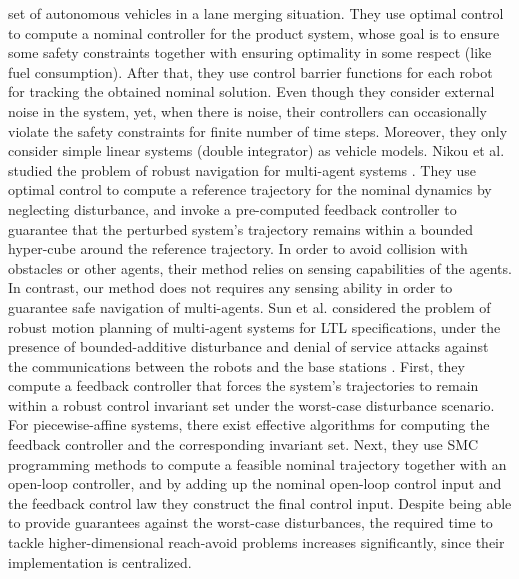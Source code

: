 \begin{enumerate}[(1)]
set of autonomous vehicles in a lane merging situation.
They use optimal control to compute a nominal controller for the product system, 
whose goal is to ensure some safety constraints together with ensuring optimality in some respect (like fuel consumption).
After that, they use control barrier functions for each robot for tracking the obtained nominal solution.
Even though they consider external noise in the system, yet, when there is noise, their controllers can 
occasionally violate the safety constraints for finite number of time steps.
Moreover, they only consider simple linear systems (double integrator) as vehicle models. 
Nikou et al. studied the problem of robust navigation for multi-agent systems \cite{Nikou2019}. 
They use optimal control to compute a reference trajectory for the nominal dynamics by neglecting disturbance, and invoke a  pre-computed feedback controller to guarantee that the perturbed system's trajectory remains within a bounded hyper-cube around the reference trajectory. In order to avoid collision with obstacles or other agents, their method relies on sensing capabilities of the agents. In contrast, our method does not requires any sensing ability in order to guarantee safe navigation of multi-agents. Sun et al. considered the problem of robust motion planning of multi-agent systems for LTL specifications, under the presence of bounded-additive disturbance and denial of service attacks against the communications between the robots and the base stations \cite{sun2019}. First, they compute a feedback controller that forces the system's trajectories to remain within a robust control invariant set under the worst-case disturbance scenario. For piecewise-affine systems, there exist effective algorithms for computing the feedback controller and the corresponding invariant set. Next, they use SMC programming methods to compute a feasible nominal trajectory together with an open-loop controller, and by adding up the nominal
open-loop control input and the feedback control law they construct the final control input. Despite being able to provide guarantees against the worst-case disturbances, the required time to tackle higher-dimensional reach-avoid problems increases significantly, since their implementation is centralized.%


\end{enumerate}
